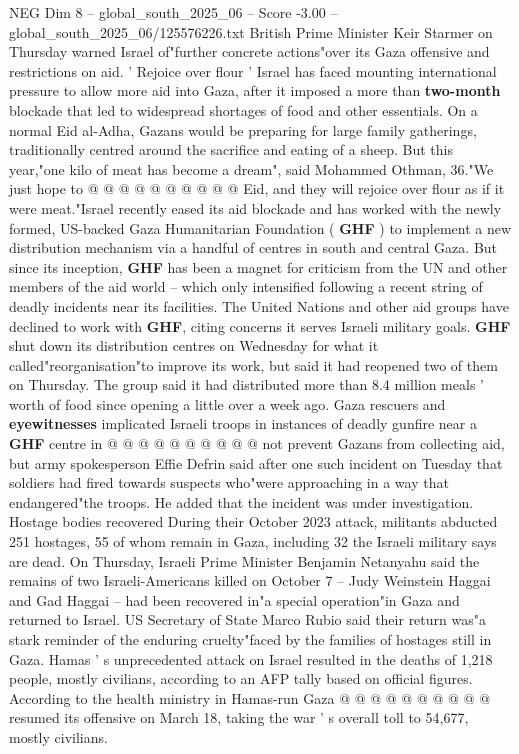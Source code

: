 \begin{textsample}{NEG Dim 8 – global\_south\_2025\_06 – Score -3.00 – global\_south\_2025\_06/125576226.txt}
British Prime Minister Keir Starmer on Thursday warned Israel of"further concrete actions"over its Gaza offensive and restrictions on aid. ' Rejoice over flour ' Israel has faced mounting international pressure to allow more aid into Gaza, after it imposed a more than \textbf{two-month} blockade that led to widespread shortages of food and other essentials.
On a normal Eid al-Adha, Gazans would be preparing for large family gatherings, traditionally centred around the sacrifice and eating of a sheep.
But this year,"one kilo of meat has become a dream", said Mohammed Othman, 36."We just hope to @ @ @ @ @ @ @ @ @ @ Eid, and they will rejoice over flour as if it were meat."Israel recently eased its aid blockade and has worked with the newly formed, US-backed Gaza Humanitarian Foundation ( \textbf{GHF} ) to implement a new distribution mechanism via a handful of centres in south and central Gaza.
But since its inception, \textbf{GHF} has been a magnet for criticism from the UN and other members of the aid world -- which only intensified following a recent string of deadly incidents near its facilities.
The United Nations and other aid groups have declined to work with \textbf{GHF}, citing concerns it serves Israeli military goals. \textbf{GHF} shut down its distribution centres on Wednesday for what it called"reorganisation"to improve its work, but said it had reopened two of them on Thursday.
The group said it had distributed more than 8.4 million meals ' worth of food since opening a little over a week ago.
Gaza rescuers and \textbf{eyewitnesses} implicated Israeli troops in instances of deadly gunfire near a \textbf{GHF} centre in @ @ @ @ @ @ @ @ @ @ not prevent Gazans from collecting aid, but army spokesperson Effie Defrin said after one such incident on Tuesday that soldiers had fired towards suspects who"were approaching in a way that endangered"the troops.
He added that the incident was under investigation.
Hostage bodies recovered During their October 2023 attack, militants abducted 251 hostages, 55 of whom remain in Gaza, including 32 the Israeli military says are dead.
On Thursday, Israeli Prime Minister Benjamin Netanyahu said the remains of two Israeli-Americans killed on October 7 -- Judy Weinstein Haggai and Gad Haggai -- had been recovered in"a special operation"in Gaza and returned to Israel.
US Secretary of State Marco Rubio said their return was"a stark reminder of the enduring cruelty"faced by the families of hostages still in Gaza.
Hamas ' s unprecedented attack on Israel resulted in the deaths of 1,218 people, mostly civilians, according to an AFP tally based on official figures.
According to the health ministry in Hamas-run Gaza @ @ @ @ @ @ @ @ @ @ resumed its offensive on March 18, taking the war ' s overall toll to 54,677, mostly civilians.

\end{textsample}
